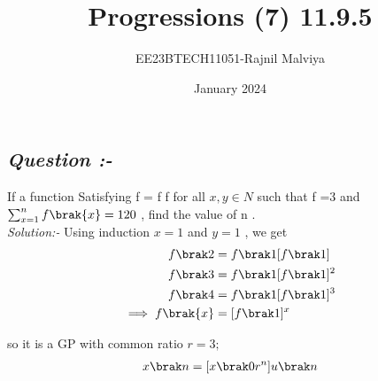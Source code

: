 \documentclass[journal,12pt,twocolumn]{IEEEtran}
\theoremstyle{remark}
\begin{document}
\title{Progressions (7) 11.9.5}
\author{EE23BTECH11051-Rajnil Malviya}
\date{January 2024}
\maketitle
\subsection*{\textit{Question :-}}
If a function Satisfying f = f f for all $x,y \in {N}$ such that f =3 and $\sum_{x=1}^{n} f\brak{x} = 120$ , find the value of n .\\
\textit{Solution:- }
Using induction  $x=1$ and $y=1$ , we get
\begin{align}
    f\brak2&={f\brak1} [f\brak 1]\\
      f\brak3&=f\brak1[{f\brak1}]^2\\
        f\brak4&=f\brak1[{f\brak1}]^3\\
        \implies   f\brak{x}&=[ f\brak1]^x
\end{align}

so it is a GP with common ratio $r=3 ;$
\begin{align}
    x \brak n = [x \brak 0r^{n}] u\brak n\label{eq:rajmal11.9.5.7}
\end{align}

\begin{table}[h!]
            
    \end{table}
\end{document}
